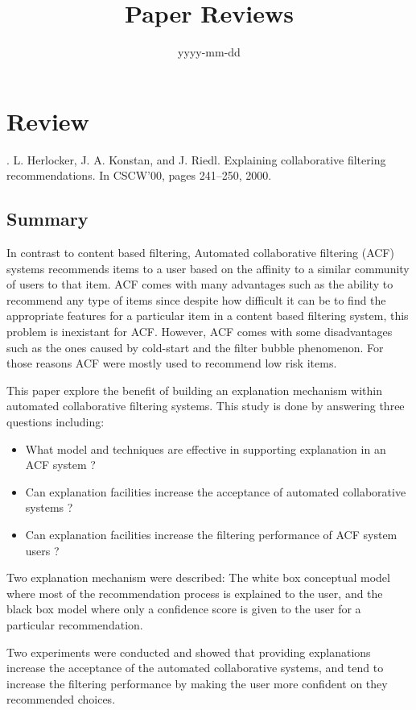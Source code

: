 \documentclass{article}
\begin{document}
\title{Paper Reviews}
\date{yyyy-mm-dd}
\maketitle

\section*{Review}
. L. Herlocker, J. A. Konstan, and J. Riedl. Explaining collaborative
filtering recommendations. In CSCW’00, pages 241–250, 2000.

\subsection*{Summary}
In contrast to content based filtering, Automated collaborative filtering
(ACF) systems recommends items to a user based on the affinity to a similar
community of users to that item. ACF comes with many advantages such as
the ability to recommend any type of items since despite how difficult it
can be to find the appropriate features for a particular item in a content
based filtering system, this problem is inexistant for ACF. However,
ACF comes with some disadvantages such as the ones caused by cold-start
and the filter bubble phenomenon. For those reasons ACF were mostly used
to recommend low risk items. 

This paper explore the benefit of building an explanation mechanism within
automated collaborative filtering systems. This study is done by answering
three questions including: 
\begin{itemize}
    \item What model and techniques are effective in supporting explanation in an ACF system ?
    \item Can explanation facilities increase the acceptance of automated collaborative systems ? 
    \item Can explanation facilities increase the filtering performance of ACF system users ? 
\end{itemize}

Two explanation mechanism were described: The white box conceptual model
where most of the recommendation process is explained to the user, and the
black box model where only a confidence score is given to the user for a
particular recommendation.

Two  experiments were conducted and showed that providing explanations
increase the acceptance of the automated collaborative systems, and tend
to increase the filtering performance by making the user more confident
on they recommended choices.
\end{document}
